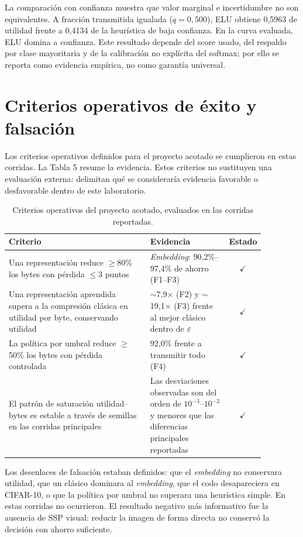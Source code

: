 La comparaci\'on con confianza muestra que valor marginal e incertidumbre no son equivalentes. A fracci\'on transmitida igualada ($q=0{,}500$), ELU obtiene 0{,}5963 de utilidad frente a 0{,}4134 de la heur\'istica de baja confianza. En la curva evaluada, ELU domina a confianza. Este resultado depende del score usado, del respaldo por clase mayoritaria y de la calibraci\'on no expl\'icita del softmax; por ello se reporta como evidencia emp\'irica, no como garant\'ia universal.

\section{Criterios operativos de \'exito y falsaci\'on}

Los criterios operativos definidos para el proyecto acotado se cumplieron en estas corridas. La Tabla 5 resume la evidencia. Estos criterios no sustituyen una evaluaci\'on externa: delimitan qu\'e se considerar\'ia evidencia favorable o desfavorable dentro de este laboratorio.

\begin{table}[t]
\centering\small
\caption{Criterios operativos del proyecto acotado, evaluados en las corridas reportadas.}
\begin{tabular}{@{}p{0.56\linewidth}p{0.31\linewidth}c@{}}
\toprule
Criterio & Evidencia & Estado\\
\midrule
Una representaci\'on reduce $\ge$80\% los bytes con p\'erdida $\le$3 puntos & \emph{Embedding}: 90{,}2\%--97{,}4\% de ahorro (F1--F3) & $\checkmark$\\
Una representaci\'on aprendida supera a la compresi\'on cl\'asica en utilidad por byte, conservando utilidad & $\sim$7{,}9$\times$ (F2) y $\sim$19{,}1$\times$ (F3) frente al mejor cl\'asico dentro de $\varepsilon$ & $\checkmark$\\
La pol\'itica por umbral reduce $\ge$50\% los bytes con p\'erdida controlada & 92{,}0\% frente a transmitir todo (F4) & $\checkmark$\\
El patr\'on de saturaci\'on utilidad--bytes es estable a trav\'es de semillas en las corridas principales & Las desviaciones observadas son del orden de $10^{-3}$--$10^{-2}$ y menores que las diferencias principales reportadas & $\checkmark$\\
\bottomrule
\end{tabular}
\end{table}

Los desenlaces de falsaci\'on estaban definidos: que el \emph{embedding} no conservara utilidad, que un cl\'asico dominara al \emph{embedding}, que el codo desapareciera en CIFAR-10, o que la pol\'itica por umbral no superara una heur\'istica simple. En estas corridas no ocurrieron. El resultado negativo m\'as informativo fue la ausencia de SSP visual: reducir la imagen de forma directa no conserv\'o la decisi\'on con ahorro suficiente.

